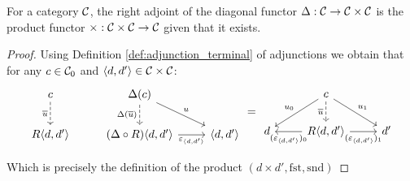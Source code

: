 \begin{theorem}
  For a category $\mathcal{C}$, the right adjoint of the diagonal functor $\Delta: \mathcal{C}\to
  \mathcal{C}\times \mathcal{C}$ is the product functor $\times:\mathcal{C}\times \mathcal{C}\to \mathcal{C}$ given that it
  exists.

  \begin{proof}
    Using Definition \ref{def:adjunction_terminal} of adjunctions we obtain that
    for any $c\in \mathcal{C}_0$ and $\langle d,d'\rangle\in \mathcal{C}\times \mathcal{C}$:
    \[\begin{tikzcd}[ampersand replacement=\&]
      c \& {\Delta(c)} \\
      {R\<d,d'\>} \& {(\Delta\circ R)\<d, d'\>} \& {\<d, d'\>}
      \arrow["{\overline{u}}"', dashed, from=1-1, to=2-1]
      \arrow["{\Delta(\overline{u})}"', dashed, from=1-2, to=2-2]
      \arrow["u", from=1-2, to=2-3]
      \arrow["{\varepsilon_{\<d,d'\>}}"', from=2-2, to=2-3]
    \end{tikzcd}
    =
    \begin{tikzcd}[ampersand replacement=\&]
      \& c \\
      d \& {R\<d,d'\>} \& {d'}
      \arrow["{\overline{u}}"', dashed, from=1-2, to=2-2]
      \arrow["{u_1}", from=1-2, to=2-3]
      \arrow["{(\varepsilon_{\<d,d'\>})_1}"', from=2-2, to=2-3]
      \arrow["{u_0}"', from=1-2, to=2-1]
      \arrow["{(\varepsilon_{\<d,d'\>})_0}", from=2-2, to=2-1]
    \end{tikzcd}\]

    Which is precisely the definition of the product $(d\times d',\mathrm{fst},
    \mathrm{snd})$
  \end{proof}
\end{theorem}

